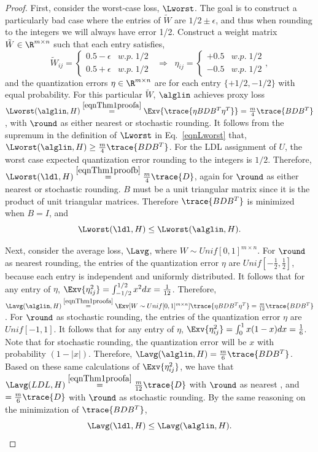 \begin{proof}
First, consider the worst-case loss, $\Lworst$.
The goal is to construct a particularly bad case where the entries of $\tilde W$ are $1/2 \pm \epsilon$, and thus when rounding to the integers we will always have error 1/2.
Construct a weight matrix $\tilde W \in \R^{m \times n}$ such that each entry satisfies,
\[
    \tilde W_{ij} 
    = 
    \begin{cases} 
        0.5 - \epsilon &w.p. \; 1/2 \\ 
        0.5 + \epsilon &w.p. \; 1/2 
    \end{cases}
    \;\;\Rightarrow\;\;
    \eta_{ij}
    =
    \begin{cases} 
        +0.5  &w.p. \; 1/2 \\ 
        -0.5 &w.p. \; 1/2 
    \end{cases},
\]
and the quantization errors $\eta \in \R^{m \times n}$ are for each entry $\{+1/2, -1/2\}$ with equal probability.
For this particular $\tilde W$, $\alglin$ achieves proxy loss $\Lworst(\alglin, H) \stackrel{\eqref{eqnThm1proofa}}{=} \Exv{ \trace{ \eta B D B^T \eta^T } } = \frac m4 \trace{ B D B^T }$, with $\round$ as either nearest or stochastic rounding.
It follows from the supremum in the definition of $\Lworst$ in Eq.~\eqref{eqnLworst} that,
$
    \Lworst(\alglin, H) 
    \geq
    \frac m4 \trace{ B D B^T }
$.
For the LDL assignment of $U$, the worst case expected quantization error rounding to the integers is $1/2$.
Therefore,
$
    \Lworst(\ldl, H)
    \stackrel{\eqref{eqnThm1proofb}}{=}
    \frac m4 \trace{ D }
$, again for $\round$ as either nearest or stochastic rounding.
$B$ must be a unit triangular matrix since it is the product of unit triangular matrices.
Therefore $\trace{ B D B^T }$ is minimized when $B = I$, and 
\[
    \Lworst(\ldl, H)
    \leq
    \Lworst(\alglin, H).
\]

Next, consider the average loss, $\Lavg$, where $W \sim Unif[0,1]^{m \times n}$.
For $\round$ as nearest rounding, the entries of the quantization error $\eta$ are $Unif[-\frac 12, \frac 12]$, because each entry is independent and uniformly distributed.
It follows that for any entry of $\eta$, $\Exv{ \eta_{ij}^2 } = \int_{-1/2}^{1/2} x^2 dx = \frac{1}{12}$.
Therefore,
$
    \Lavg(\alglin, H)
    \stackrel{\eqref{eqnThm1proofa}}{=}
    \Exv[{W \sim Unif[0,1]^{m \times n}}]{\trace{ \eta B D B^T \eta^T } }
    =
    \frac{m}{12} \trace{ B D B^T }
$.
For $\round$ as stochastic rounding, the entries of the quantization error $\eta$ are $Unif[-1,1]$.
It follows that for any entry of $\eta$, $\Exv{ \eta_{ij}^2 } = \int_0^1 x (1-x) dx = \frac16$.
Note that for stochastic rounding, the quantization error will be $x$ with probability $(1-|x|)$.
Therefore,
$
    \Lavg(\alglin, H)
    = 
    \frac m6 \trace{ B D B^T }
$. 
Based on these same calculations of $\Exv{ \eta_{ij}^2 }$, we have that $\Lavg(LDL, H) \stackrel{\eqref{eqnThm1proofa}}{=} \frac{m}{12} \trace{ D }$ with $\round$ as nearest , and $= \frac m6 \trace { D }$ with $\round$ as stochastic rounding.
By the same reasoning on the minimization of $\trace{ B D B^T }$,
\[
    \Lavg(\ldl, H)
    \leq
    \Lavg(\alglin, H).
\]

\end{proof}

